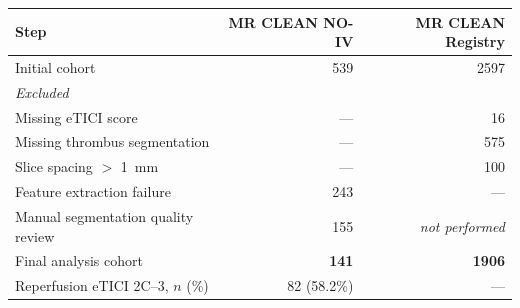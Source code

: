 {\footnotesize\setlength{\tabcolsep}{4pt}%
\begin{tabular}{lrr}
\toprule
Step & MR CLEAN NO-IV & MR CLEAN Registry \\
\midrule
Initial cohort & 539 & 2597 \\
\midrule
\multicolumn{3}{l}{\emph{Excluded}} \\
\quad Missing eTICI score & --- & 16 \\
\quad Missing thrombus segmentation & --- & 575 \\
\quad Slice spacing $>$ 1~mm & --- & 100 \\
\quad Feature extraction failure & 243 & --- \\
\quad Manual segmentation quality review & 155 & \emph{not performed} \\
\midrule
Final analysis cohort & \textbf{141} & \textbf{1906} \\
Reperfusion eTICI 2C--3, $n$ (\%) & 82 (58.2\%) & --- \\
\bottomrule
\end{tabular}}
